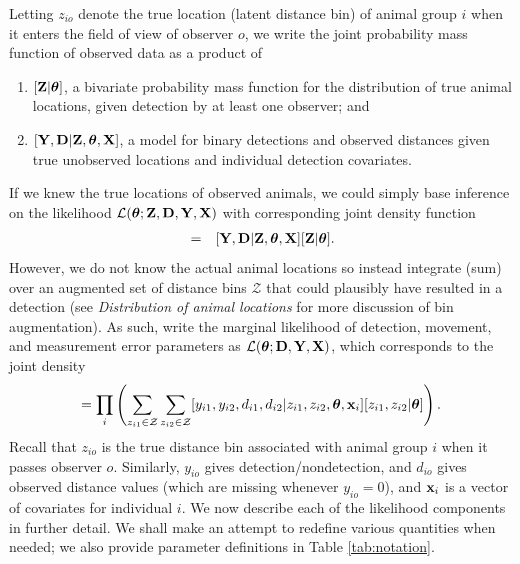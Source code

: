 \documentclass[aoas,preprint]{imsart}
\numberwithin{equation}{section}
\theoremstyle{plain}
\begin{document}
Letting $z_{io}$ denote the true location (latent distance bin) of animal group $i$ when it enters the field of view of observer $o$, we write the joint probability mass function of observed data as a product of
\begin{enumerate}
   \item $[{\bf Z}|\boldsymbol{\theta}]$, a bivariate probability mass function for the distribution of true animal locations, given detection by at least one observer; and
   \item $[{\bf Y},{\bf D}|{\bf Z},\boldsymbol{\theta},{\bf X}]$, a model for binary detections and observed distances given true unobserved locations and individual detection covariates.
\end{enumerate}
If we knew the true locations of observed animals, we could simply base inference on the likelihood $\mathcal{L}(\boldsymbol{\theta};{\bf Z},{\bf D},{\bf Y},{\bf X})$ with corresponding joint density function
\begin{eqnarray*}
  [{\bf Z},{\bf D},{\bf Y}|\boldsymbol{\theta},{\bf X}] & = & [{\bf Y},{\bf D}|{\bf Z},\boldsymbol{\theta},{\bf X}][{\bf Z}|\boldsymbol{\theta}].
\end{eqnarray*}
However, we do not know the actual animal locations so instead integrate (sum) over an augmented set of distance bins $\mathcal{Z}$ that could plausibly have resulted in a detection (see \textit{Distribution of animal locations} for more discussion of bin augmentation).
As such, write the marginal likelihood of detection, movement, and measurement error parameters as $\mathcal{L}(\boldsymbol{\theta};{\bf D},{\bf Y},{\bf X})$, which corresponds to the joint density
\begin{equation}
  [{\bf Y},{\bf D}|\boldsymbol{\theta},{\bf X}] = \prod_i \left( \sum_{z_{i1} \in \mathcal{Z}} \sum_{z_{i2} \in \mathcal{Z}} [y_{i1},y_{i2}, d_{i1}, d_{i2}|z_{i1} , z_{i2}, \boldsymbol{\theta} , {\bf x}_i][z_{i1},z_{i2}  |\boldsymbol{\theta}]
   \right).
  \label{eq:lik}
\end{equation}
Recall that $z_{i o}$ is the true distance bin associated with animal group $i$ when it passes observer $o$.  Similarly, $y_{io}$ gives detection/nondetection, and $d_{io}$ gives observed distance values (which are missing whenever $y_{io}=0$), and $\textbf{x}_i$ is a vector of covariates for individual $i$.  We now describe each of the likelihood components in further detail.  We shall make an attempt to redefine various quantities when needed; we also provide parameter definitions in Table \ref{tab:notation}.
\end{document}
